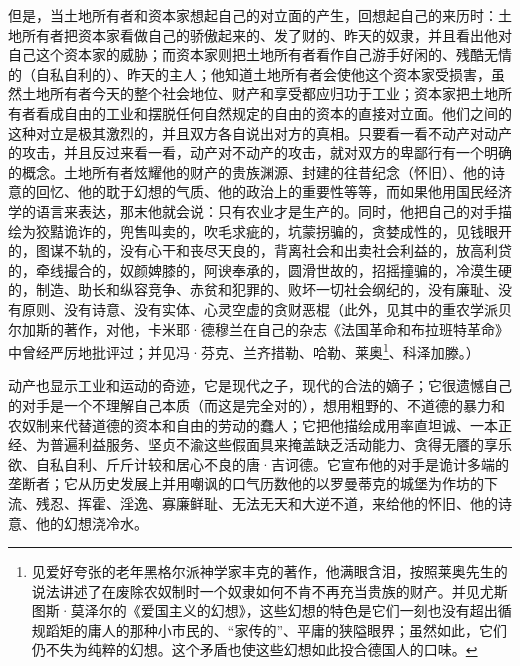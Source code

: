 \documentclass[a4paper,twoside,12pt]{ctexart}
\begin{document}
但是，当土地所有者和资本家想起自己的对立面的产生，回想起自己的来历时：土地所有者把资本家看做自己的骄傲起来的、发了财的、昨天的奴隶，并且看出他对自己这个资本家的威胁；而资本家则把土地所有者看作自己游手好闲的、残酷无情的（自私自利的）、昨天的主人；他知道土地所有者会使他这个资本家受损害，虽然土地所有者今天的整个社会地位、财产和享受都应归功于工业；资本家把土地所有者看成自由的工业和摆脱任何自然规定的自由的资本的直接对立面。他们之间的这种对立是极其激烈的，并且双方各自说出对方的真相。只要看一看不动产对动产的攻击，并且反过来看一看，动产对不动产的攻击，就对双方的卑鄙行有一个明确的概念。土地所有者炫耀他的财产的贵族渊源、封建的往昔纪念（怀旧）、他的诗意的回忆、他的耽于幻想的气质、他的政治上的重要性等等，而如果他用国民经济学的语言来表达，那末他就会说：只有农业才是生产的。同时，他把自己的对手描绘为狡黠诡诈的，兜售叫卖的，吹毛求疵的，坑蒙拐骗的，贪婪成性的，见钱眼开的，图谋不轨的，没有心干和丧尽天良的，背离社会和出卖社会利益的，放高利贷的，牵线撮合的，奴颜婢膝的，阿谀奉承的，圆滑世故的，招摇撞骗的，冷漠生硬的，制造、助长和纵容竞争、赤贫和犯罪的、败坏一切社会纲纪的，没有廉耻、没有原则、没有诗意、没有实体、心灵空虚的贪财恶棍（此外，见其中的重农学派贝尔加斯的著作，对他，卡米耶·德穆兰在自己的杂志《法国革命和布拉班特革命》中曾经严厉地批评过；并见冯·芬克、兰齐措勒、哈勒、莱奥\footnote{见爱好夸张的老年黑格尔派神学家丰克的著作，他满眼含泪，按照莱奥先生的说法讲述了在废除农奴制时一个奴隶如何不肯不再充当贵族的财产。并见尤斯图斯·莫泽尔的《爱国主义的幻想》，这些幻想的特色是它们一刻也没有超出循规蹈矩的庸人的那种小市民的、“家传的”、平庸的狭隘眼界；虽然如此，它们仍不失为纯粹的幻想。这个矛盾也使这些幻想如此投合德国人的口味。}、科泽加滕。）

动产也显示工业和运动的奇迹，它是现代之子，现代的合法的嫡子；它很遗憾自己的对手是一个不理解自己本质（而这是完全对的），想用粗野的、不道德的暴力和农奴制来代替道德的资本和自由的劳动的蠢人；它把他描绘成用率直坦诚、一本正经、为普遍利益服务、坚贞不渝这些假面具来掩盖缺乏活动能力、贪得无餍的享乐欲、自私自利、斤斤计较和居心不良的唐·吉诃德。它宣布他的对手是诡计多端的垄断者；它从历史发展上并用嘲讽的口气历数他的以罗曼蒂克的城堡为作坊的下流、残忍、挥霍、淫逸、寡廉鲜耻、无法无天和大逆不道，来给他的怀旧、他的诗意、他的幻想浇冷水。
\end{document}
